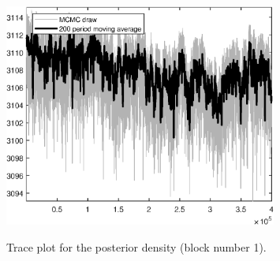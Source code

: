 \begin{figure}[H]
\centering
  \includegraphics[width=0.8\textwidth]{BRS_growth/graphs/TracePlot_Posterior_blck_1}\\
    \caption{Trace plot for the posterior density (block number 1).}
\end{figure}
